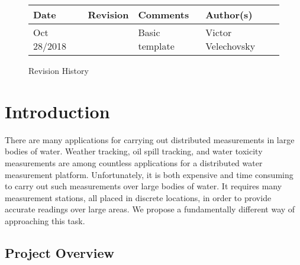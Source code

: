 \documentclass[11pt]{article}
\begin{document}
\vfill
\begin{figure}[htbp]
   \centering
   \noindent\begin{tabularx}{\textwidth}{| >{\centering\arraybackslash}m{} | >{\centering\arraybackslash}m{} | >{\centering\arraybackslash}m{} | >{\centering\arraybackslash}m{} |}
   \hline 
   \textbf{Date} & \textbf{Revision} & \textbf{Comments} & \textbf{Author(s)} \\
   \hline
   Oct 28/2018 & 0 & Basic template & Victor Velechovsky\\ \hline
   \end{tabularx}
   \caption{Revision History}
\end{figure}

\newpage

\section{Introduction}

There are many applications for carrying out distributed measurements in large bodies of water. Weather tracking, oil spill tracking, and water toxicity measurements are among countless applications for a distributed water measurement platform. Unfortunately, it is both expensive and time consuming to carry out such measurements over large bodies of water. It requires many measurement stations, all placed in discrete locations, in order to provide accurate readings over large areas. We propose a fundamentally different way of approaching this task.

\subsection{Project Overview}
\end{document}
